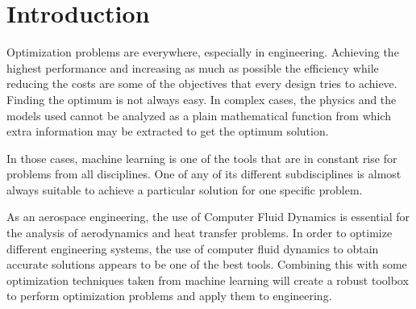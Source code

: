 \chapter{Introduction}

Optimization problems are everywhere, especially in engineering. Achieving the highest performance and increasing as much as possible the efficiency while reducing the costs are some of the objectives that every design tries to achieve. Finding the optimum is not always easy. In complex cases, the physics and the models used cannot be analyzed as a plain mathematical function from which extra information may be extracted to get the optimum solution. 

In those cases, machine learning is one of the tools that are in constant rise for problems from all disciplines. One of any of its different subdisciplines is almost always suitable to achieve a particular solution for one specific problem. 

As an aerospace engineering, the use of Computer Fluid Dynamics is essential for the analysis of aerodynamics and heat transfer problems. In order to optimize different engineering systems, the use of computer fluid dynamics to obtain accurate solutions appears to be one of the best tools. Combining this with some optimization techniques taken from machine learning will create a robust toolbox to perform optimization problems and apply them to engineering. 